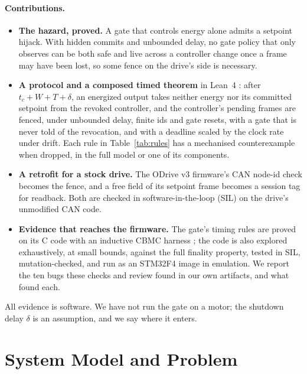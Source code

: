 \documentclass[letterpaper]{article} %
\begin{document}
\paragraph{Contributions.}
\begin{itemize}
\item \textbf{The hazard, proved.} A gate that controls energy alone admits a setpoint hijack. With
hidden commits and unbounded delay, no gate policy that only observes can be both safe and live
across a controller change once a frame may have been lost, so some fence on the drive's side is
necessary.
\item \textbf{A protocol and a composed timed theorem} in Lean~4 \citep{demoura2021lean4}: after
$t_c + W + T + \delta$, an energized output takes neither energy nor its committed setpoint from
the revoked controller, and the controller's pending frames are fenced, under unbounded delay,
finite ids and gate resets, with a gate that is never told of the revocation, and with a deadline
scaled by the clock rate under drift. Each rule in Table~\ref{tab:rules} has a mechanised
counterexample when dropped, in the full model or one of its components.
\item \textbf{A retrofit for a stock drive.} The ODrive v3 firmware's CAN node-id check becomes
the fence, and a free field of its setpoint frame becomes a session tag for readback. Both are
checked in software-in-the-loop (SIL) on the drive's unmodified CAN code.
\item \textbf{Evidence that reaches the firmware.} The gate's timing rules are proved on its C code
with an inductive CBMC harness \citep{clarke2004cbmc}; the code is also explored exhaustively,
at small bounds, against the full finality property, tested
in SIL, mutation-checked, and run as an STM32F4 image in emulation. We report the ten bugs these
checks and review found in our own artifacts, and what found each.
\end{itemize}

All evidence is software. We have not run the gate on a motor; the shutdown delay $\delta$ is an
assumption, and we say where it enters.

\section{System Model and Problem}
\label{sec:model}
\end{document}

